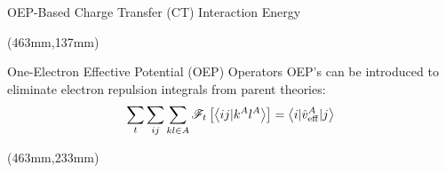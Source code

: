 \documentclass[final]{beamer} %
\newcommand{\BraKet}[2]{\ensuremath{\bigl\langle {#1} \bigl\lvert {#2} \bigr\rangle}}
\newcommand{\tBraKet}[3]{\ensuremath{\bigl\langle {#1} \bigl\lvert {#2} \bigl\lvert {#3} \bigr\rangle}}
\begin{document}
\begin{frame}{OEP-Based Charge Transfer (CT) Interaction Energy}
\begin{textblock*}{367mm}(463mm,137mm)
\begin{exampleblock}{One-Electron Effective Potential (OEP) Operators}
OEP's can be introduced to eliminate electron repulsion integrals from parent theories:
\begin{equation*}
 \sum_t \sum_{ij} \sum_{kl\in A} \mathscr{F}_t 
 \left[ 
  \left< ij \vert k^A l^A \right>
 \right] 
  = \left<  
      i \vert \hat{v}^A_{\rm eff} \vert j
    \right>
\end{equation*}
\end{exampleblock}
\end{textblock*}

\begin{textblock*}{367mm}(463mm,233mm)
\end{textblock*}


\end{frame}
\end{document}
